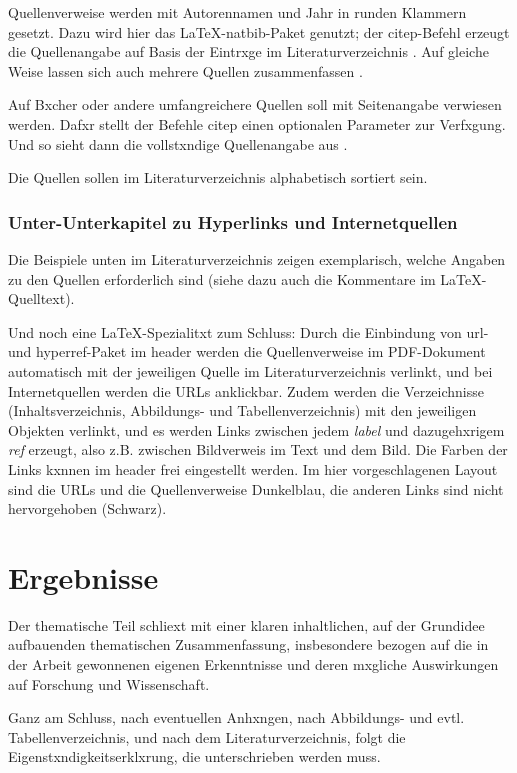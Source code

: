 Quellenverweise werden mit Autorennamen und Jahr in runden Klammern gesetzt. Dazu wird hier das \LaTeX-natbib-Paket genutzt; der citep-Befehl erzeugt die Quellenangabe auf Basis der Eintrxge im Literaturverzeichnis \citep{bluray}. Auf gleiche Weise lassen sich auch mehrere Quellen zusammenfassen \citep{dooley_streicher,stephenson}. 

Auf Bxcher oder andere umfangreichere Quellen soll mit Seitenangabe verwiesen werden. Dafxr stellt der Befehle citep  einen optionalen Parameter zur Verfxgung. Und so sieht dann die vollstxndige Quellenangabe aus \citep[116]{kuttruff}. 

Die Quellen sollen im Literaturverzeichnis alphabetisch sortiert sein.


\subsection{Unter-Unterkapitel zu Hyperlinks und Internetquellen}

Die Beispiele unten im Literaturverzeichnis zeigen exemplarisch, welche Angaben zu den Quellen erforderlich sind (siehe dazu auch die Kommentare im \LaTeX-Quelltext). 

Und noch eine \LaTeX-Spezialitxt zum Schluss: Durch die Einbindung von url- und hyperref-Paket im header werden die Quellenverweise im PDF-Dokument automatisch mit der jeweiligen Quelle im Literaturverzeichnis verlinkt, und bei Internetquellen werden die URLs anklickbar. Zudem werden die Verzeichnisse (Inhaltsverzeichnis, Abbildungs- und Tabellenverzeichnis) mit den jeweiligen Objekten verlinkt, und es werden Links zwischen jedem \emph{label} und  dazugehxrigem \emph{ref} erzeugt, also z.B. zwischen Bildverweis im Text und dem Bild. Die Farben der Links kxnnen im header frei eingestellt werden. Im hier vorgeschlagenen Layout sind die URLs und die Quellenverweise Dunkelblau, die anderen Links sind nicht hervorgehoben (Schwarz). 


\chapter{Ergebnisse}

Der thematische Teil schliext mit einer klaren inhaltlichen, auf der Grundidee aufbauenden thematischen Zusammenfassung, insbesondere bezogen auf die in der Arbeit gewonnenen eigenen Erkenntnisse und deren mxgliche Auswirkungen auf Forschung und Wissenschaft. 

Ganz am Schluss, nach eventuellen Anhxngen, nach Abbildungs- und evtl. Tabellenverzeichnis, und nach dem Literaturverzeichnis, folgt die Eigenstxndigkeitserklxrung, die unterschrieben werden muss.


